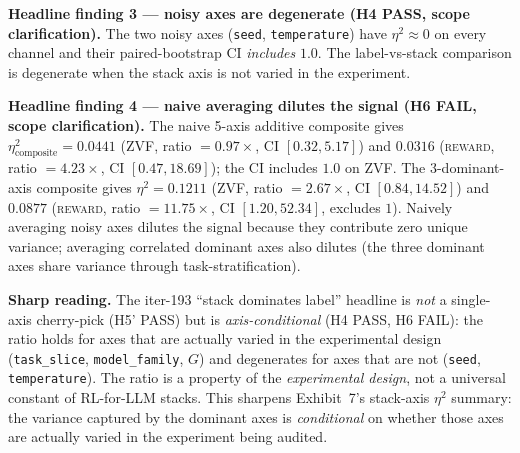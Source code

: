 \textbf{Headline finding 3 --- noisy axes are degenerate (H4 PASS,
scope clarification).} The two noisy axes (\texttt{seed},
\texttt{temperature}) have $\eta^2 \approx 0$ on every channel and their
paired-bootstrap CI \emph{includes} $1.0$. The label-vs-stack comparison
is degenerate when the stack axis is not varied in the experiment.

\textbf{Headline finding 4 --- naive averaging dilutes the signal (H6
FAIL, scope clarification).} The naive 5-axis additive composite gives
$\eta^2_\text{composite} = 0.0441$ (\textsc{ZVF}, ratio $=0.97\times$,
CI $[0.32, 5.17]$) and $0.0316$ (\textsc{reward}, ratio $=4.23\times$,
CI $[0.47, 18.69]$); the CI includes $1.0$ on \textsc{ZVF}. The 3-dominant-axis composite gives $\eta^2 = 0.1211$ (\textsc{ZVF}, ratio
$=2.67\times$, CI $[0.84, 14.52]$) and $0.0877$ (\textsc{reward},
ratio $=11.75\times$, CI $[1.20, 52.34]$, excludes $1$). Naively
averaging noisy axes dilutes the signal because they contribute zero
unique variance; averaging correlated dominant axes also dilutes (the
three dominant axes share variance through task-stratification).

\textbf{Sharp reading.} The iter-193 ``stack dominates label''
headline is \emph{not} a single-axis cherry-pick (H5' PASS) but is
\emph{axis-conditional} (H4 PASS, H6 FAIL): the ratio holds for axes that
are actually varied in the experimental design (\texttt{task\_slice},
\texttt{model\_family}, $G$) and degenerates for axes that are not
(\texttt{seed}, \texttt{temperature}). The ratio is a property of the
\emph{experimental design}, not a universal constant of RL-for-LLM
stacks. This sharpens Exhibit~7's stack-axis $\eta^2$ summary: the
variance captured by the dominant axes is \emph{conditional} on whether
those axes are actually varied in the experiment being audited.

